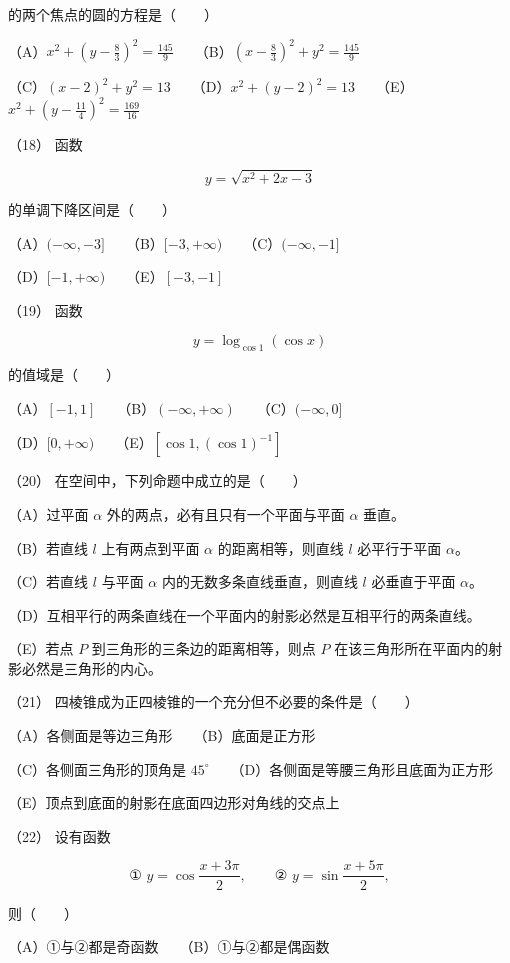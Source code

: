 \begin{answer}
的两个焦点的圆的方程是\mbox{（　　）}

（A）$x^2+(y-\frac83)^2=\frac{145}{9}$　　（B）$(x-\frac83)^2+y^2=\frac{145}{9}$

（C）$(x-2)^2+y^2=13$　　（D）$x^2+(y-2)^2=13$　　（E）$x^2+(y-\frac{11}4)^2=\frac{169}{16}$

（18） 函数

\nopagebreak[4]
\[
y=\sqrt{x^2+2x-3}
\]

的单调下降区间是\mbox{（　　）}

（A）$(-\infty,-3]$　　（B）$[-3,+\infty)$　　（C）$(-\infty,-1]$

（D）$[-1,+\infty)$　　（E）$[-3,-1]$

（19） 函数

\nopagebreak[4]
\[
y=\log_{\cos1}(\cos x)
\]

的值域是\mbox{（　　）}

（A）$[-1,1]$　　（B）$(-\infty,+\infty)$　　（C）$(-\infty,0]$

（D）$[0,+\infty)$　　（E）$[\cos1,(\cos1)^{-1}]$

（20） 在空间中，下列命题中成立的是\mbox{（　　）}

（A）过平面 $\alpha$ 外的两点，必有且只有一个平面与平面 $\alpha$ 垂直。

（B）若直线 $l$ 上有两点到平面 $\alpha$ 的距离相等，则直线 $l$ 必平行于平面 $\alpha$。

（C）若直线 $l$ 与平面 $\alpha$ 内的无数多条直线垂直，则直线 $l$ 必垂直于平面 $\alpha$。

（D）互相平行的两条直线在一个平面内的射影必然是互相平行的两条直线。

（E）若点 $P$ 到三角形的三条边的距离相等，则点 $P$ 在该三角形所在平面内的射影必然是三角形的内心。

（21） 四棱锥成为正四棱锥的一个充分但不必要的条件是\mbox{（　　）}

（A）各侧面是等边三角形　　（B）底面是正方形

（C）各侧面三角形的顶角是 $45^\circ$　　（D）各侧面是等腰三角形且底面为正方形

（E）顶点到底面的射影在底面四边形对角线的交点上

（22） 设有函数

\nopagebreak[4]
\[
\text{① }y=\cos\frac{x+3\pi}{2},\qquad
\text{② }y=\sin\frac{x+5\pi}{2},
\]

则\mbox{（　　）}

（A）①与②都是奇函数　　（B）①与②都是偶函数


\end{answer}
